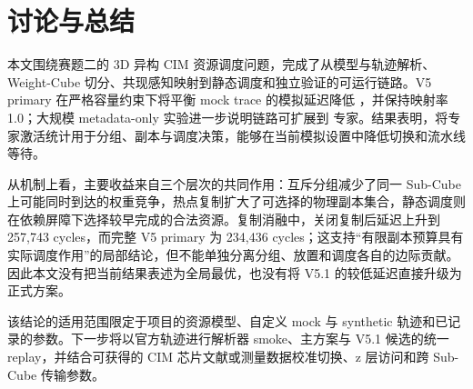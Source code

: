 \section{讨论与总结}
本文围绕赛题二的 3D 异构 CIM 资源调度问题，完成了从模型与轨迹解析、Weight-Cube 切分、共现感知映射到静态调度和独立验证的可运行链路。V5 primary 在严格容量约束下将平衡 mock trace 的模拟延迟降低 \PrimaryImprovement{}，并保持映射率 1.0；大规模 metadata-only 实验进一步说明链路可扩展到 \LargeExperts{} 专家。结果表明，将专家激活统计用于分组、副本与调度决策，能够在当前模拟设置中降低切换和流水线等待。

从机制上看，主要收益来自三个层次的共同作用：互斥分组减少了同一 Sub-Cube 上可能同时到达的权重竞争，热点复制扩大了可选择的物理副本集合，静态调度则在依赖屏障下选择较早完成的合法资源。复制消融中，关闭复制后延迟上升到 257,743 cycles，而完整 V5 primary 为 234,436 cycles；这支持“有限副本预算具有实际调度作用”的局部结论，但不能单独分离分组、放置和调度各自的边际贡献。因此本文没有把当前结果表述为全局最优，也没有将 V5.1 的较低延迟直接升级为正式方案。

该结论的适用范围限定于项目的资源模型、自定义 mock 与 synthetic 轨迹和已记录的参数。下一步将以官方轨迹进行解析器 smoke、主方案与 V5.1 候选的统一 replay，并结合可获得的 CIM 芯片文献或测量数据校准切换、z 层访问和跨 Sub-Cube 传输参数。
